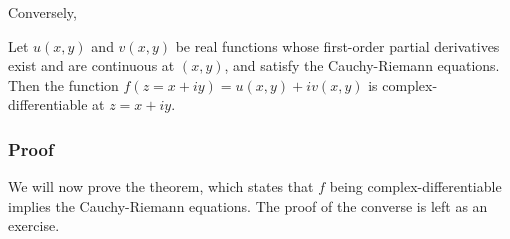 \documentclass[10pt,a4paper]{article}
\begin{document}
Conversely,

\begin{framed}
\noindent
Let $u(x,y)$ and $v(x,y)$ be real functions whose first-order partial
derivatives exist and are continuous at $(x,y)$, and satisfy the
Cauchy-Riemann equations. Then the function $f(z = x+iy) = u(x,y) +
iv(x,y)$ is complex-differentiable at $z = x + i y$.
\end{framed}

\subsubsection{Proof}\label{proof}

We will now prove the theorem, which states that $f$ being
complex-differentiable implies the Cauchy-Riemann equations. The proof
of the converse is left as an exercise.
\end{document}
